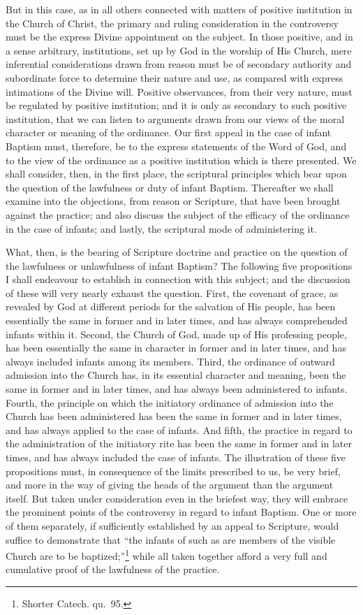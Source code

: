 \documentclass[
  english,
]{book}
\begin{document}
But in this case, as in all others connected with matters of positive institution in the Church of Christ, the primary and ruling consideration in the controversy must be the express Divine appointment on the subject. In those positive, and in a sense arbitrary, institutions, set up by God in the worship of His Church, mere inferential considerations drawn from reason must be of secondary authority and subordinate force to determine their nature and use, as compared with express intimations of the Divine will. Positive observances, from their very nature, must be regulated by positive institution; and it is only as secondary to such positive institution, that we can listen to arguments drawn from our views of the moral character or meaning of the ordinance. Our first appeal in the case of infant Baptism must, therefore, be to the express statements of the Word of God, and to the view of the ordinance as a positive institution which is there presented. We shall consider, then, in the first place, the scriptural principles which bear upon the question of the lawfulness or duty of infant Baptism. Thereafter we shall examine into the objections, from reason or Scripture, that have been brought against the practice; and also discuss the subject of the efficacy of the ordinance in the case of infants; and lastly, the scriptural mode of administering it.

What, then, is the bearing of Scripture doctrine and practice on the question of the lawfulness or unlawfulness of infant Baptism? The following five propositions I shall endeavour to establish in connection with this subject; and the discussion of these will very nearly exhaust the question. First, the covenant of grace, as revealed by God at different periods for the salvation of His people, has been essentially the same in former and in later times, and has always comprehended infants within it. Second, the Church of God, made up of His professing people, has been essentially the same in character in former and in later times, and has always included infants among its members. Third, the ordinance of outward admission into the Church has, in its essential character and meaning, been the same in former and in later times, and has always been administered to infants. Fourth, the principle on which the initiatory ordinance of admission into the Church has been administered has been the same in former and in later times, and has always applied to the case of infants. And fifth, the practice in regard to the administration of the initiatory rite has been the same in former and in later times, and has always included the case of infants. The illustration of these five propositions must, in consequence of the limits prescribed to us, be very brief, and more in the way of giving the heads of the argument than the argument itself. But taken under consideration even in the briefest way, they will embrace the prominent points of the controversy in regard to infant Baptism. One or more of them separately, if sufficiently established by an appeal to Scripture, would suffice to demonstrate that ``the infants of such as are members of the visible Church are to be baptized;''\footnote{Shorter Catech. qu.~95.} while all taken together afford a very full and cumulative proof of the lawfulness of the practice.
\end{document}
